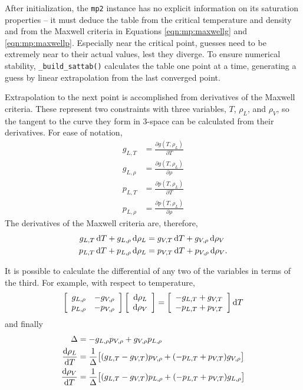 After initialization, the \texttt{mp2} instance has no explicit information on its saturation properties -- it must deduce the table from the critical temperature and density and from the Maxwell criteria in Equations \ref{eqn:mp:maxwellg} and \ref{eqn:mp:maxwellp}.  Especially near the critical point, guesses need to be extremely near to their actual values, lest they diverge.  To ensure numerical stability, \verb|_build_sattab()| calculates the table one point at a time, generating a guess by linear extrapolation from the last converged point.

Extrapolation to the next point is accomplished from derivatives of the Maxwell criteria.  These represent two constraints with three variables, $T$, $\rho_L$, and $\rho_V$, so the tangent to the curve they form in 3-space can be calculated from their derivatives.  For ease of notation,
\begin{subequations}
\begin{align}
g_{L,T} &= \frac{\partial g(T, \rho_L)}{\partial T}\\
g_{L,\rho} &= \frac{\partial g(T, \rho_L)}{\partial \rho}\\ 
p_{L,T} &= \frac{\partial p(T, \rho_L)}{\partial T}\\
p_{L,\rho} &= \frac{\partial p(T, \rho_L)}{\partial \rho}
\end{align}
\end{subequations}
The derivatives of the Maxwell criteria are, therefore,
\begin{subequations}
\begin{align}
g_{L,T}\, \mathrm{d} T + g_{L,\rho}\, \mathrm{d} \rho_L &= g_{V,T}\, \mathrm{d} T + g_{V,\rho}\, \mathrm{d} \rho_V\\
p_{L,T}\, \mathrm{d} T + p_{L,\rho}\, \mathrm{d} \rho_L &= p_{V,T}\, \mathrm{d} T + p_{V,\rho}\, \mathrm{d} \rho_V.
\end{align}
\end{subequations}

It is possible to calculate the differential of any two of the variables in terms of the third.  For example, with respect to temperature,
\begin{align}
\left[\begin{array}{cc}
g_{L,\rho} & -g_{V,\rho}\\
p_{L,\rho} & -p_{V,\rho}
\end{array}\right]  \left[\begin{array}{c}
\mathrm{d} \rho_L \\
\mathrm{d} \rho_V
\end{array}\right] = 
\left[\begin{array}{c}
-g_{L,T} + g_{V,T} \\
-p_{L,T} + p_{V,T}
\end{array}\right] \mathrm{d} T
\end{align}
and finally
\begin{align}
\Delta &= -g_{L,\rho} p_{V,\rho} + g_{V,\rho} p_{L,\rho}\\
\frac{\mathrm{d} \rho_L}{\mathrm{d} T} &= \frac{1}{\Delta}\big[(g_{L,T}-g_{V,T}) p_{V,\rho} + (-p_{L,T}+p_{V,T}) g_{V,\rho}  \big]\\
\frac{\mathrm{d} \rho_V}{\mathrm{d} T} &= \frac{1}{\Delta}\big[(g_{L,T}-g_{V,T}) p_{L,\rho} + (-p_{L,T}+p_{V,T}) g_{L,\rho}  \big]
\end{align}

